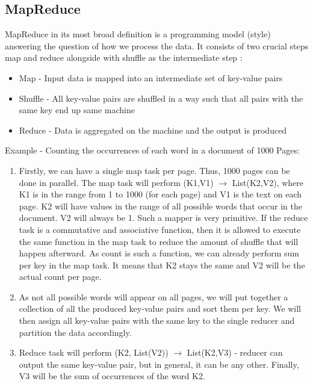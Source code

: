 \subsection{MapReduce}
MapReduce \cite{MapReduce} in its most broad definition is a programming model (style) answering the question of how we process the data. It consists of two crucial steps map and reduce alongside with shuffle as the intermediate step \cite{BigDataCourse}: %
\begin{itemize}
	\item Map - Input data is mapped into an intermediate set of key-value pairs
	\item Shuffle - All key-value pairs are shuffled in a way such that all pairs with the same key end up same machine
	\item Reduce - Data is aggregated on the machine and the output is produced
\end{itemize}
Example - Counting the occurrences of each word in a document of 1000 Pages:

\begin{enumerate}
	\item Firstly, we can have a single map task per page. Thus, 1000 pages can be done in parallel. The map task will perform (K1,V1) $\rightarrow$ List(K2,V2), where K1 is in the range from 1 to 1000 (for each page) and V1 is the text on each page. K2 will have values in the range of all possible words that occur in the document. V2 will always be 1. Such a mapper is very primitive. If the reduce task is a commutative and associative function, then it is allowed to execute the same function in the map task to reduce the amount of shuffle that will happen afterward. As count is such a function, we can already perform sum per key in the map task. It means that K2 stays the same and V2 will be the actual count per page.
	\item As not all possible words will appear on all pages, we will put together a collection of all the produced key-value pairs and sort them per key. We will then assign all key-value pairs with the same key to the single reducer and partition the data accordingly.
	\item Reduce task will perform (K2, List(V2)) $\rightarrow$ List(K2,V3) - reducer can output the same key-value pair, but in general, it can be any other. Finally, V3 will be the sum of occurrences of the word K2.
\end{enumerate}
   
